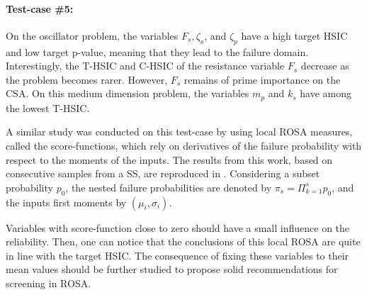 \paragraph{Test-case \#5:}
On the oscillator problem, the variables $F_s, \zeta_s$, and $\zeta_p$ have a high target HSIC and low target p-value, meaning that they lead to the failure domain.    
Interestingly, the T-HSIC and C-HSIC of the resistance variable $F_s$ decrease as the problem becomes rarer. 
However, $F_s$ remains of prime importance on the CSA. 
On this medium dimension problem, the variables $m_p$ and $k_s$ have among the lowest T-HSIC. 

A similar study was conducted on this test-case by \citet{bourinet_2018} using local ROSA measures, called the score-functions, which rely on derivatives of the failure probability with respect to the moments of the inputs. 
The results from this work, based on consecutive samples from a SS, are reproduced in . 
Considering a subset probability $p_0$, the nested failure probabilities are denoted by $\pi_s = \Pi_{k=1}^s p_0$, and the inputs first moments by $(\mu_i, \sigma_i)$. 

Variables with score-function close to zero should have a small influence on the reliability. 
Then, one can notice that the conclusions of this local ROSA are quite in line with the target HSIC. 
The consequence of fixing these variables to their mean values should be further studied to propose solid recommendations for screening in ROSA.


